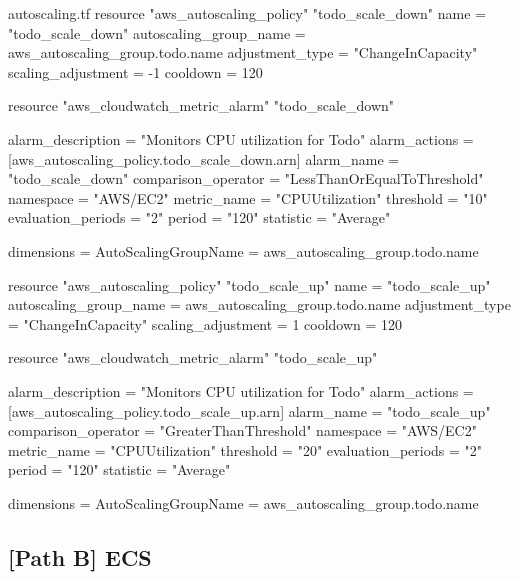 \documentclass{csse4400}
\begin{document}
\begin{code}[language=terraform,numbers=none]{autoscaling.tf}
resource "aws_autoscaling_policy" "todo_scale_down" {
  name                   = "todo_scale_down"
  autoscaling_group_name = aws_autoscaling_group.todo.name
  adjustment_type        = "ChangeInCapacity"
  scaling_adjustment     = -1
  cooldown               = 120
}

resource "aws_cloudwatch_metric_alarm" "todo_scale_down" {
  alarm_description   = "Monitors CPU utilization for Todo"
  alarm_actions       = [aws_autoscaling_policy.todo_scale_down.arn]
  alarm_name          = "todo_scale_down"
  comparison_operator = "LessThanOrEqualToThreshold"
  namespace           = "AWS/EC2"
  metric_name         = "CPUUtilization"
  threshold           = "10"
  evaluation_periods  = "2"
  period              = "120"
  statistic           = "Average"

  dimensions = {
    AutoScalingGroupName = aws_autoscaling_group.todo.name
  }
}

resource "aws_autoscaling_policy" "todo_scale_up" {
  name                   = "todo_scale_up"
  autoscaling_group_name = aws_autoscaling_group.todo.name
  adjustment_type        = "ChangeInCapacity"
  scaling_adjustment     = 1
  cooldown               = 120
}

resource "aws_cloudwatch_metric_alarm" "todo_scale_up" {
  alarm_description   = "Monitors CPU utilization for Todo"
  alarm_actions       = [aws_autoscaling_policy.todo_scale_up.arn]
  alarm_name          = "todo_scale_up"
  comparison_operator = "GreaterThanThreshold"
  namespace           = "AWS/EC2"
  metric_name         = "CPUUtilization"
  threshold           = "20"
  evaluation_periods  = "2"
  period              = "120"
  statistic           = "Average"

  dimensions = {
    AutoScalingGroupName = aws_autoscaling_group.todo.name
  }
}
\end{code}
\subsection{[Path B] ECS}
\end{document}
